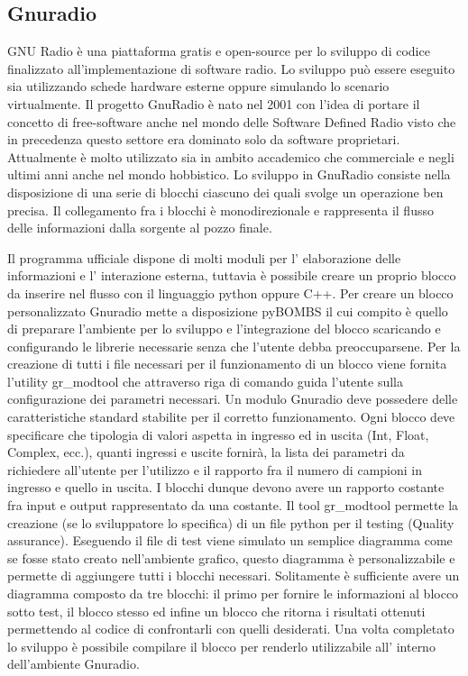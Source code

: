 \begin{itemize}
\chapter{Gnuradio}
GNU Radio è una piattaforma gratis e open-source per lo sviluppo di codice finalizzato all'implementazione di software radio. Lo sviluppo può essere eseguito sia utilizzando schede hardware esterne oppure simulando lo scenario virtualmente. Il progetto GnuRadio è nato nel 2001 con l'idea di portare il concetto di free-software anche nel mondo delle Software Defined Radio visto che in precedenza questo settore era dominato solo da software proprietari. Attualmente è molto utilizzato sia in ambito accademico che commerciale e negli ultimi anni anche nel mondo hobbistico. Lo sviluppo in GnuRadio consiste nella disposizione di una serie di blocchi ciascuno dei quali svolge un operazione ben precisa. Il collegamento fra i blocchi è monodirezionale e rappresenta il flusso delle informazioni dalla sorgente al pozzo finale.

 Il programma ufficiale dispone di molti moduli per l' elaborazione delle informazioni e l' interazione esterna, tuttavia è possibile creare un proprio blocco da inserire nel flusso con il linguaggio python oppure C++. Per creare un blocco personalizzato Gnuradio mette a disposizione pyBOMBS il cui compito è quello di preparare l'ambiente per lo sviluppo e l'integrazione del blocco scaricando e configurando le librerie necessarie senza che l'utente debba preoccuparsene.
 Per la creazione di tutti i file necessari per il funzionamento di un blocco viene fornita l'utility gr\_modtool che attraverso riga di comando guida l'utente sulla configurazione dei parametri necessari. Un modulo Gnuradio deve possedere delle caratteristiche standard stabilite per il corretto funzionamento. Ogni blocco deve specificare che tipologia di valori aspetta in ingresso ed in uscita (Int, Float, Complex, ecc.), quanti ingressi e uscite fornirà, la lista dei parametri da richiedere all'utente per l'utilizzo e il rapporto fra il numero di campioni in ingresso e quello in uscita. I blocchi dunque devono avere un rapporto costante fra input e output rappresentato da una costante. Il tool gr\_modtool permette la creazione (se lo sviluppatore lo specifica) di un file python per il testing (Quality assurance). Eseguendo il file di test viene simulato un semplice diagramma come se fosse stato creato nell'ambiente grafico, questo diagramma è personalizzabile e permette di aggiungere tutti i blocchi necessari. Solitamente è sufficiente avere un diagramma composto da tre blocchi: il primo per fornire le informazioni al blocco sotto test, il blocco stesso ed infine un blocco che ritorna i risultati ottenuti permettendo al codice di confrontarli con quelli desiderati.
 Una volta completato lo sviluppo è possibile compilare il blocco per renderlo utilizzabile all' interno dell'ambiente Gnuradio.


\end{itemize}
